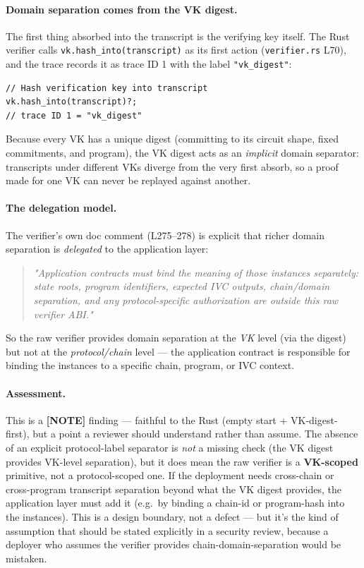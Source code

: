 \paragraph{Domain separation comes from the VK digest.} The first
thing absorbed into the transcript is the verifying key itself.
The Rust verifier calls \texttt{vk.hash\_\allowbreak{}into(transcript)} as its
first action (\texttt{verifier.rs} L70), and the trace records it
as trace ID 1 with the label \texttt{"vk\_digest"}:
\begin{lstlisting}[style=rust]
// Hash verification key into transcript
vk.hash_into(transcript)?;
// trace ID 1 = "vk_digest"
\end{lstlisting}
Because every VK has a unique digest (committing to its circuit
shape, fixed commitments, and program), the VK digest acts as an
\emph{implicit} domain separator: transcripts under different VKs
diverge from the very first absorb, so a proof made for one VK can
never be replayed against another.

\paragraph{The delegation model.} The verifier's own doc comment
(L275--278) is explicit that richer domain separation is
\emph{delegated} to the application layer:
\begin{quote}
\emph{"Application contracts must bind the meaning of those
instances separately: state roots, program identifiers, expected
IVC outputs, chain/domain separation, and any protocol-specific
authorization are outside this raw verifier ABI."}
\end{quote}
So the raw verifier provides domain separation at the \emph{VK}
level (via the digest) but not at the \emph{protocol/chain} level
--- the application contract is responsible for binding the
instances to a specific chain, program, or IVC context.

\paragraph{Assessment.} This is a \textcolor{mathpurple}{\textbf{[NOTE]}}
finding --- faithful to the Rust (empty start + VK-digest-first),
but a point a reviewer should understand rather than assume. The
absence of an explicit protocol-label separator is \emph{not} a
missing check (the VK digest provides VK-level separation), but it
does mean the raw verifier is a \textbf{VK-scoped} primitive, not a
protocol-scoped one. If the deployment needs cross-chain or
cross-program transcript separation beyond what the VK digest
provides, the application layer must add it (e.g.\ by binding a
chain-id or program-hash into the instances). This is a design
boundary, not a defect --- but it's the kind of assumption that
should be stated explicitly in a security review, because a
deployer who assumes the verifier provides chain-domain-separation
would be mistaken.

